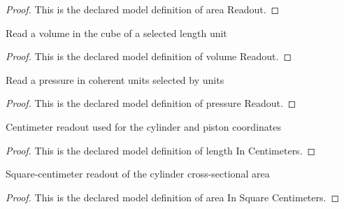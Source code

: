 \begin{proof}
  This is the declared model definition of area Readout.
\end{proof}
\begin{definition}
  \label{def:physics:phyx-mini-0359:phyxminiproblems-problemphyxmini0359-volumereadout}
  Read a volume in the cube of a selected length unit
\end{definition}
\begin{proof}
  This is the declared model definition of volume Readout.
\end{proof}
\begin{definition}
  \label{def:physics:phyx-mini-0359:phyxminiproblems-problemphyxmini0359-pressurereadout}
  Read a pressure in coherent units selected by units
\end{definition}
\begin{proof}
  This is the declared model definition of pressure Readout.
\end{proof}
\begin{definition}
  \label{def:physics:phyx-mini-0359:phyxminiproblems-problemphyxmini0359-lengthincentimeters}
  Centimeter readout used for the cylinder and piston coordinates
\end{definition}
\begin{proof}
  This is the declared model definition of length In Centimeters.
\end{proof}
\begin{definition}
  \label{def:physics:phyx-mini-0359:phyxminiproblems-problemphyxmini0359-areainsquarecentimeters}
  Square-centimeter readout of the cylinder cross-sectional area
\end{definition}
\begin{proof}
  This is the declared model definition of area In Square Centimeters.
\end{proof}
